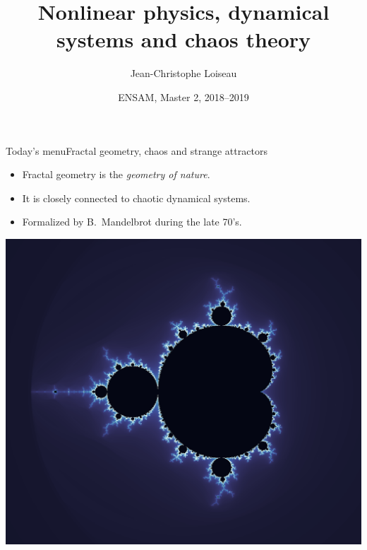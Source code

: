 \documentclass[usenames,dvipsnames,svgnames,10pt,aspectratio=169]{beamer}
\title[Nonlinear Physics] %
{
	Nonlinear physics, dynamical \\ systems and chaos theory
}
\author[J.-Ch.~Loiseau] %
{
	Jean-Christophe Loiseau
}
\institute[unused]
{
	\url{jean-christophe.loiseau@ensam.eu} \\
	DynFluid, \\
	Arts et M\'etiers ParisTech, France
}
\date[unused]{ENSAM, Master 2, 2018--2019}
\begin{document}
\titleframe %


\begin{frame}[t, c]{Today's menu}{Fractal geometry, chaos and strange attractors}
	\centering

	\begin{minipage}{.48\textwidth}
		\begin{itemize}
			\item Fractal geometry is the \emph{geometry of nature}.
			\medskip
			\item It is closely connected to chaotic dynamical systems.
			\medskip
			\item Formalized by B.\ Mandelbrot during the late 70's.
		\end{itemize}
	\end{minipage}%
	\hfill
	\begin{minipage}{.48\textwidth}
		\centering
		\includegraphics[width=.9\columnwidth]{Mandelbrot_set}
	\end{minipage}

	\vspace{1cm}
\end{frame}
\end{document}
